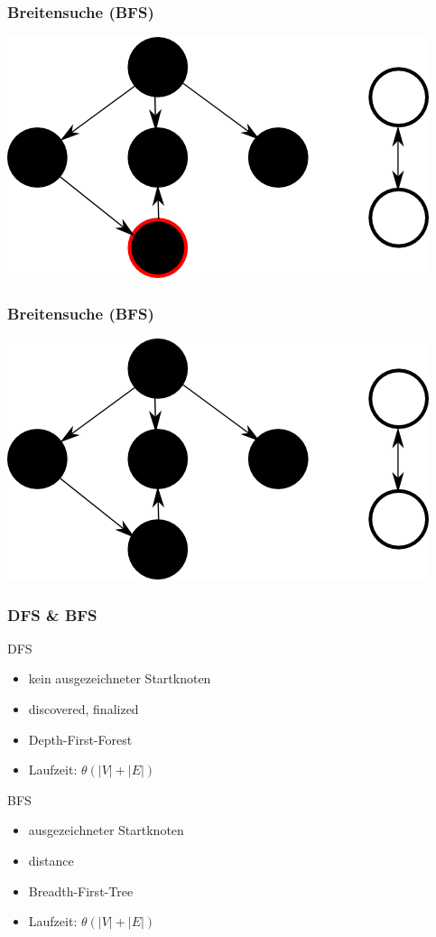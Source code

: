 \documentclass{beamer}
\begin{document}
\begin{frame}
\frametitle{Breitensuche (BFS)}
\includegraphics{bfs7}
\end{frame}


\begin{frame}
\frametitle{Breitensuche (BFS)}
\includegraphics{bfs8}
\end{frame}


\begin{frame}
\frametitle{DFS \& BFS}
\begin{block}{DFS}
\begin{itemize}
\item kein ausgezeichneter Startknoten
\item discovered, finalized
\item Depth-First-Forest
\item Laufzeit: $\theta(|V| + |E|)$
\end{itemize}
\end{block}

\begin{block}{BFS}
\begin{itemize}
\item ausgezeichneter Startknoten
\item distance
\item Breadth-First-Tree
\item Laufzeit: $\theta(|V| + |E|)$
\end{itemize}
\end{block}
\end{frame}
\end{document}
